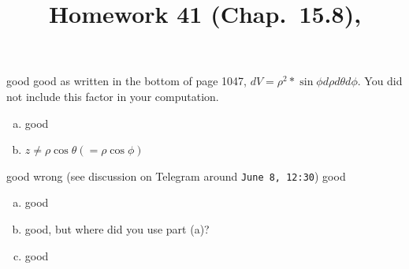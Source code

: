 \documentclass[pstricks,10pt,dvipsnames]{article} %
\title{Homework 41 (Chap.~15.8),
}
\begin{document}
\maketitle
{}
good
good
as written in the bottom of page 1047, $dV=\rho^2*\sin\phi d\rho d\theta d\phi$. You did
not include this factor in your computation.
\begin{enumerate}[(a)]
	\item good
	\item $z\neq\rho\cos\theta(= \rho\cos\phi)$
\end{enumerate}
good
wrong (see discussion on Telegram around \texttt{June 8, 12:30})
good
\begin{enumerate}[(a)]
	\item good
	\item good, but where did you use part (a)?
	\item good
\end{enumerate}
\end{document}
